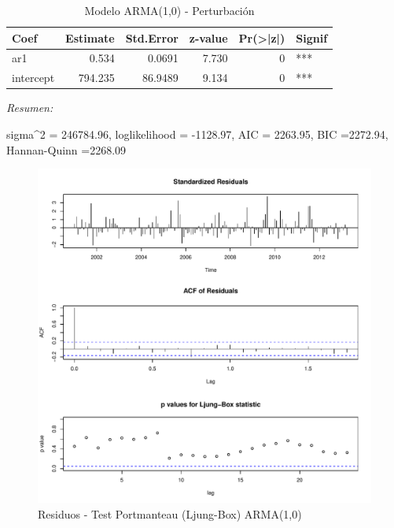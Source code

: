 \documentclass[12pt,oneside]{book}\usepackage[]{graphicx}\usepackage[]{color}
\makeatletter
\def\maxwidth{ %
  \ifdim\Gin@nat@width>\linewidth
    \linewidth
  \else
    \Gin@nat@width
  \fi
}
\newenvironment{knitrout}{}{} %
\theoremstyle{definition} %
\makeatother
\begin{document}
\begin{knitrout}
\color{fgcolor}\begin{table}

\caption{\label{tab:unnamed-chunk-46}\label{tab:arma_nt}Modelo ARMA(1,0) - Perturbación}
\centering
\begin{threeparttable}
\begin{tabular}[t]{lrrrrl}
\toprule
Coef & Estimate & Std.Error & z-value & Pr(>|z|) & Signif\\
\midrule
\rowcolor{gray!6}  ar1 & 0.534 & 0.0691 & 7.730 & 0 & ***\\
intercept & 794.235 & 86.9489 & 9.134 & 0 & ***\\
\bottomrule
\end{tabular}
\begin{tablenotes}
\item \textit{Resumen:} 
\item sigma\textasciicircum{}2 = 246784.96, loglikelihood = -1128.97, AIC = 2263.95, BIC =2272.94, Hannan-Quinn =2268.09
\end{tablenotes}
\end{threeparttable}
\end{table}


\end{knitrout}


\begin{knitrout}
\color{fgcolor}\begin{figure}[H]

{\centering \includegraphics[width=\maxwidth]{figure/unnamed-chunk-47-1} 

}

\caption{\label{fig:nt_resid} Residuos - Test Portmanteau (Ljung-Box) ARMA(1,0)}\label{fig:unnamed-chunk-47}
\end{figure}


\end{knitrout}
\end{document}
